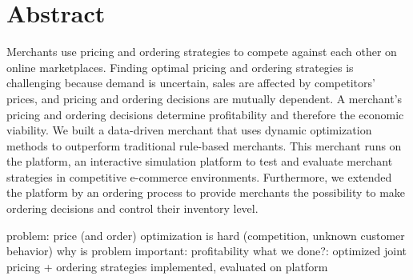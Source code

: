 \chapter*{Abstract}
Merchants use pricing and ordering strategies to compete against each other on online marketplaces.
Finding optimal pricing and ordering strategies is challenging because demand is uncertain, sales are affected by competitors' prices, and pricing and ordering decisions are mutually dependent.
A merchant's pricing and ordering decisions determine profitability and therefore the economic viability.
We built a data-driven merchant that uses dynamic optimization methods to outperform traditional rule-based merchants.
This merchant runs on the \pricewars platform, an interactive simulation platform to test and evaluate merchant strategies in competitive e-commerce environments.
Furthermore, we extended the platform by an ordering process to provide merchants the possibility to make ordering decisions and control their inventory level.


problem: price (and order) optimization is hard (competition, unknown customer behavior)
why is problem important: profitability
what we done?:
	optimized joint pricing + ordering strategies
	implemented, evaluated on platform